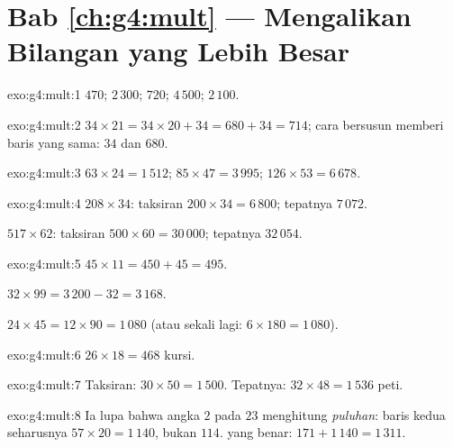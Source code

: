 \section*{Bab \ref{ch:g4:mult} --- Mengalikan Bilangan yang Lebih Besar}

\begin{solution}{exo:g4:mult:1}
$470$; \quad $2\,300$; \quad $720$; \quad $4\,500$; \quad
$2\,100$.
\end{solution}

\begin{solution}{exo:g4:mult:2}
$34 \times 21 = 34 \times 20 + 34 = 680 + 34 = 714$; cara bersusun
memberi baris yang sama: $34$ dan $680$.
\end{solution}

\begin{solution}{exo:g4:mult:3}
$63 \times 24 = 1\,512$; \quad
$85 \times 47 = 3\,995$; \quad
$126 \times 53 = 6\,678$.
\end{solution}

\begin{solution}{exo:g4:mult:4}
$208 \times 34$: taksiran $200 \times 34 = 6\,800$; tepatnya
$7\,072$.

$517 \times 62$: taksiran $500 \times 60 = 30\,000$; tepatnya
$32\,054$.
\end{solution}

\begin{solution}{exo:g4:mult:5}
$45 \times 11 = 450 + 45 = 495$.

$32 \times 99 = 3\,200 - 32 = 3\,168$.

$24 \times 45 = 12 \times 90 = 1\,080$ (atau sekali lagi:
$6 \times 180 = 1\,080$).
\end{solution}

\begin{solution}{exo:g4:mult:6}
$26 \times 18 = 468$ kursi.
\end{solution}

\begin{solution}{exo:g4:mult:7}
Taksiran: $30 \times 50 = 1\,500$. Tepatnya:
$32 \times 48 = 1\,536$ peti.
\end{solution}

\begin{solution}{exo:g4:mult:8}
Ia lupa bahwa angka $2$ pada $23$ menghitung \emph{puluhan}: baris
kedua seharusnya $57 \times 20 = 1\,140$, bukan $114$.  yang
benar: $171 + 1\,140 = 1\,311$.
\end{solution}

